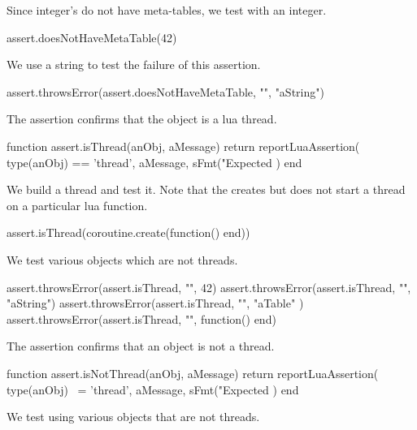 Since integer's do not have meta-tables, we test with an integer.

\startLuaTest
  assert.doesNotHaveMetaTable(42)
\stopLuaTest
\stopTestCase


We use a string to test the failure of this assertion. 

\startLuaTest
  assert.throwsError(assert.doesNotHaveMetaTable, "", "aString")
\stopLuaTest
\stopTestCase

\stopTestSuite


The  assertion confirms that the object is a lua 
thread. 

\startLuaCode
function assert.isThread(anObj, aMessage)
  return reportLuaAssertion(
    type(anObj) == 'thread',
    aMessage,
    sFmt("Expected %
  )
end
\stopLuaCode


We build a thread and test it. Note that the  
creates but does not start a thread on a particular lua function. 

\startLuaTest
  assert.isThread(coroutine.create(function() end))
\stopLuaTest
\stopTestCase


We test various objects which are not threads.

\startLuaTest
  assert.throwsError(assert.isThread, "", 42)
  assert.throwsError(assert.isThread, "", "aString")
  assert.throwsError(assert.isThread, "", { "aTable" })
  assert.throwsError(assert.isThread, "", function() end)
\stopLuaTest
\stopTestCase

\stopTestSuite


The  assertion confirms that an object is not a 
thread. 

\startLuaCode
function assert.isNotThread(anObj, aMessage)
  return reportLuaAssertion(
    type(anObj) ~= 'thread',
    aMessage,
    sFmt("Expected %
  )
end
\stopLuaCode


We test using various objects that are not threads. 

